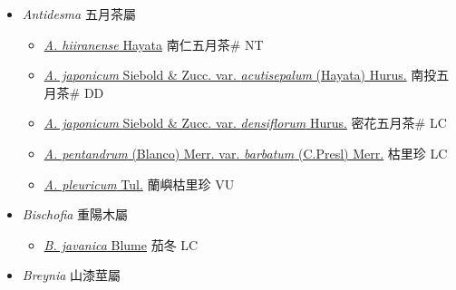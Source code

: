 
  \begin{itemize}
 \item[] \textit{Antidesma} 五月茶屬
                    
  \begin{itemize}
        \item[] \href{http://www.theplantlist.org/tpl1.1/search?q=Antidesma+hiiranense}{\textit{A. hiiranense} Hayata}   南仁五月茶\# NT
        \item[] \href{http://www.theplantlist.org/tpl1.1/search?q=Antidesma+japonicum+var.+acutisepalum}{\textit{A. japonicum} Siebold \& Zucc. var. \textit{acutisepalum} (Hayata) Hurus.}   南投五月茶\# DD
        \item[] \href{http://www.theplantlist.org/tpl1.1/search?q=Antidesma+japonicum+var.+densiflorum}{\textit{A. japonicum} Siebold \& Zucc. var. \textit{densiflorum} Hurus.}   密花五月茶\# LC
        \item[] \href{http://www.theplantlist.org/tpl1.1/search?q=Antidesma+pentandrum+var.+barbatum}{\textit{A. pentandrum} (Blanco) Merr. var. \textit{barbatum} (C.Presl) Merr.}   枯里珍 LC
        \item[] \href{http://www.theplantlist.org/tpl1.1/search?q=Antidesma+pleuricum}{\textit{A. pleuricum} Tul.}   蘭嶼枯里珍 VU
  \end{itemize}
 \item[] \textit{Bischofia} 重陽木屬
                    
  \begin{itemize}
        \item[] \href{http://www.theplantlist.org/tpl1.1/search?q=Bischofia+javanica}{\textit{B. javanica} Blume}   茄冬 LC
  \end{itemize}
 \item[] \textit{Breynia} 山漆莖屬
                    

\end{itemize}
